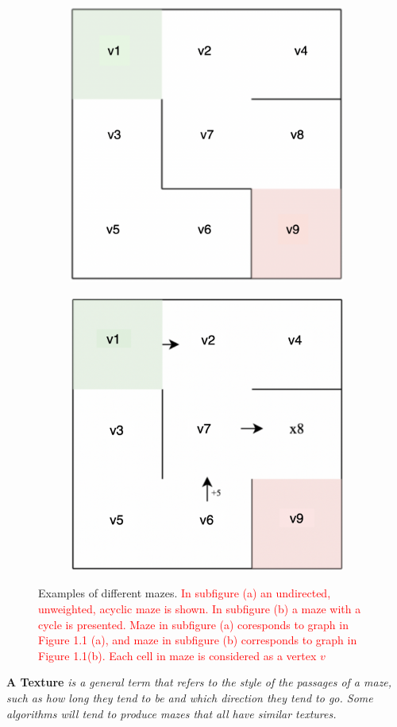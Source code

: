  \begin{figure}[!h]
	\centering
	\begin{subfigure}{.45\textwidth}
	  \centering
	  \includegraphics[width=.6\linewidth]{undirectedmaze}
	  \caption{}
	  \label{fig:sub1}
	\end{subfigure}
	\begin{subfigure}{.45\textwidth}
	  \centering
	  \includegraphics[width=.6\linewidth]{cyclicmaze}
	  \caption{}
	  \label{fig:sub2}
	\end{subfigure}
	\caption{Examples of different mazes. \textcolor{red}{In subfigure (a) an undirected, unweighted, acyclic maze is shown. In subfigure (b) a maze with a cycle is presented. Maze in subfigure (a) coresponds to graph in Figure 1.1 (a), and maze in subfigure (b) corresponds to graph in Figure 1.1(b). Each cell in maze is considered as a vertex $v$}}
	\label{fig:test}
	\end{figure}	
 \begin{definition}\textbf{A Texture} \emph{is a general term that refers to the style of the passages of a maze, such as how long they tend to be and which direction they tend to go. Some algorithms will tend to produce mazes that all have similar textures.\cite{Buck}}\end{definition}
